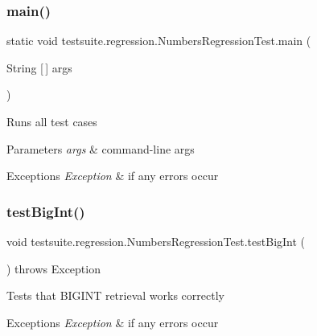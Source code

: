 \subsubsection{\texorpdfstring{main()}{main()}}
{\footnotesize\ttfamily static void testsuite.\+regression.\+Numbers\+Regression\+Test.\+main (\begin{DoxyParamCaption}\item[{String \mbox{[}$\,$\mbox{]}}]{args }\end{DoxyParamCaption})\hspace{0.3cm}{\ttfamily [static]}}

Runs all test cases


\begin{DoxyParams}{Parameters}
{\em args} & command-\/line args\\
\hline
\end{DoxyParams}

\begin{DoxyExceptions}{Exceptions}
{\em Exception} & if any errors occur \\
\hline
\end{DoxyExceptions}
\mbox{\label{classtestsuite_1_1regression_1_1_numbers_regression_test_a442fb6acce36ae3342c30c04bac684df}} 
\subsubsection{\texorpdfstring{test\+Big\+Int()}{testBigInt()}}
{\footnotesize\ttfamily void testsuite.\+regression.\+Numbers\+Regression\+Test.\+test\+Big\+Int (\begin{DoxyParamCaption}{ }\end{DoxyParamCaption}) throws Exception}

Tests that B\+I\+G\+I\+NT retrieval works correctly


\begin{DoxyExceptions}{Exceptions}
{\em Exception} & if any errors occur \\
\hline
\end{DoxyExceptions}
\mbox{\label{classtestsuite_1_1regression_1_1_numbers_regression_test_a8b734d31cfe73a510c1e2c9a5f2d049f}} 
